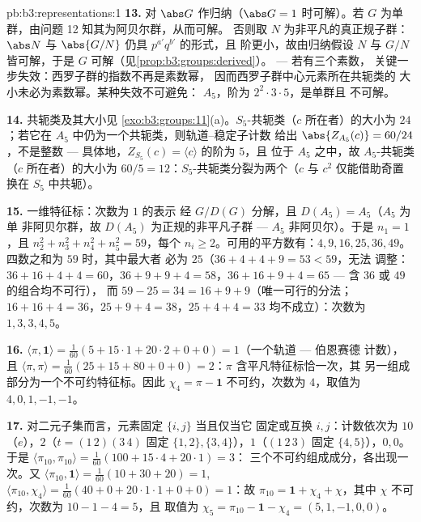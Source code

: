 \begin{solution}{pb:b3:representations:1}
\textbf{13.} 对 $\abs G$ 作归纳（$\abs G = 1$ 时可解）。若
$G$ 为单群，由问题 12 知其为阿贝尔群，从而可解。
否则取 $N$ 为非平凡的真正规子群：$\abs
N$ 与 $\abs{G/N}$ 仍具 $p^{a'}q^{b'}$ 的形式，且
阶更小，故由归纳假设 $N$ 与 $G/N$ 皆可解，于是 $G$
可解（见\cref{prop:b3:groups:derived}）。 --- 若有三个素数，
关键一步失效：西罗子群的指数不再是素数幂，
因而西罗子群中心元素所在共轭类的
大小未必为素数幂。某种失效不可避免：
$A_5$，阶为 $2^2\cdot3\cdot5$，是单群且
不可解。

\textbf{14.} 共轭类及其大小见
\cref{exo:b3:groups:11}(a)。$S_5$-共轭类（$c$ 所在者）的大小为
$24$；若它在 $A_5$ 中仍为一个共轭类，则轨道--稳定子计数
给出 $\abs{Z_{A_5}(c)} = 60/24$，不是整数 ---
具体地，$Z_{S_5}(c) = \langle c\rangle$ 的阶为 $5$，且
位于 $A_5$ 之中，故 $A_5$-共轭类（$c$ 所在者）的大小为 $60/5 =
12$：$S_5$-共轭类分裂为两个（$c$ 与 $c^2$
仅能借助奇置换在 $S_5$ 中共轭）。

\textbf{15.} 一维特征标：次数为 $1$ 的表示
经 $G/D(G)$ 分解，且 $D(A_5) = A_5$（$A_5$ 为单
非阿贝尔群，故 $D(A_5)$ 为正规的非平凡子群 ---
$A_5$ 非阿贝尔）。于是 $n_1 = 1$，且 $n_2^2 + n_3^2 + n_4^2
+ n_5^2 = 59$，每个 $n_i \geq 2$。可用的平方数有：$4, 9,
16, 25, 36, 49$。四数之和为 $59$ 时，其中最大者
必为 $25$（$36 + 4 + 4 + 9 = 53 < 59$，无法
调整：$36 + 16 + 4 + 4 = 60$，$36 + 9 + 9 + 4 = 58$，$36 +
16 + 9 + 4 = 65$ --- 含 $36$ 或 $49$ 的组合均不可行），
而 $59 - 25 = 34 = 16 + 9 + 9$（唯一可行的分法；$16 + 16 + 4 =
36$，$25 + 9 + 4 = 38$，$25 + 4 + 4 = 33$ 均不成立）：次数为 $1, 3, 3,
4, 5$。

\textbf{16.} $\langle\pi, \mathbf 1\rangle = \frac1{60}(5 +
15\cdot1 + 20\cdot2 + 0 + 0) = 1$（一个轨道 --- 伯恩赛德
计数），且 $\langle\pi, \pi\rangle = \frac1{60}(25 + 15 + 80 +
0 + 0) = 2$：$\pi$ 含平凡特征标恰一次，其
另一组成部分为一个不可约特征标。因此 $\chi_4 = \pi
- \mathbf 1$ 不可约，次数为 $4$，取值为 $4, 0,
1, -1, -1$。

\textbf{17.} 对二元子集而言，元素固定 $\{i,j\}$ 当且仅当它
固定或互换 $i, j$：计数依次为 $10$（$e$），$2$（$t =
(1\,2)(3\,4)$ 固定 $\{1,2\}, \{3,4\}$），$1$（$(1\,2\,3)$
固定 $\{4,5\}$），$0, 0$。于是 $\langle\pi_{10},
\pi_{10}\rangle = \frac1{60}(100 + 15\cdot4 + 20\cdot1) = 3$：
三个不可约组成成分，各出现一次。又
$\langle\pi_{10}, \mathbf 1\rangle = \frac1{60}(10 + 30 + 20)
= 1$, $\langle\pi_{10}, \chi_4\rangle = \frac1{60}(40 + 0 +
20\cdot1\cdot1 + 0 + 0) = 1$：故 $\pi_{10} = \mathbf 1 + \chi_4
+ \chi$，其中 $\chi$ 不可约，次数为 $10 - 1 - 4 = 5$，且
取值为 $\chi_5 = \pi_{10} - \mathbf 1 - \chi_4 = (5, 1, -1, 0,
0)$。


\end{solution}
